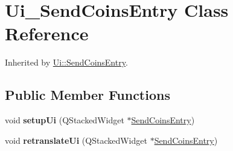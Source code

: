 \hypertarget{class_ui___send_coins_entry}{}\section{Ui\+\_\+\+Send\+Coins\+Entry Class Reference}
\label{class_ui___send_coins_entry}


Inherited by \mbox{\hyperlink{class_ui_1_1_send_coins_entry}{Ui\+::\+Send\+Coins\+Entry}}.

\subsection*{Public Member Functions}
\begin{DoxyCompactItemize}
\item 
\mbox{\label{class_ui___send_coins_entry_a95119ab3cfd1ffa2f9ace382c097b148}} 
void {\bfseries setup\+Ui} (Q\+Stacked\+Widget $\ast$\mbox{\hyperlink{class_send_coins_entry}{Send\+Coins\+Entry}})
\item 
\mbox{\label{class_ui___send_coins_entry_af5d88f657872c78e3f4a88375e9f0428}} 
void {\bfseries retranslate\+Ui} (Q\+Stacked\+Widget $\ast$\mbox{\hyperlink{class_send_coins_entry}{Send\+Coins\+Entry}})
\end{DoxyCompactItemize}
